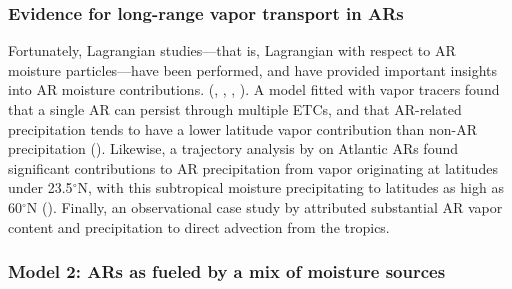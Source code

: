 \documentclass[letterpaper,12pt]{article}
\begin{document}
\subsubsection{Evidence for long-range vapor transport in ARs}

Fortunately, Lagrangian studies---that is, Lagrangian with respect to AR moisture particles---have been performed, and have provided important insights into AR moisture contributions. (\cite{Stohl2008}, \cite{Ralph2011AWave}, \cite{Sodemann2013}, \cite{Ramos2016}). A model fitted with vapor tracers found that a single AR can persist through multiple ETCs, and that AR-related precipitation tends to have a lower latitude vapor contribution than non-AR precipitation (\cite{Sodemann2013}). Likewise, a trajectory analysis by \cite{Ramos2016} on Atlantic ARs found significant contributions to AR precipitation from vapor originating at latitudes under 23.5$^{\circ}$N, with this subtropical moisture precipitating to latitudes as high as 60$^{\circ}$N (\cite{Stohl2008}). Finally, an observational case study by \cite{Ralph2011AWave} attributed substantial AR vapor content and precipitation to direct advection from the tropics. 

\subsubsection{Model 2: ARs as fueled by a mix of moisture sources}\label{sec:M2}
\end{document}
